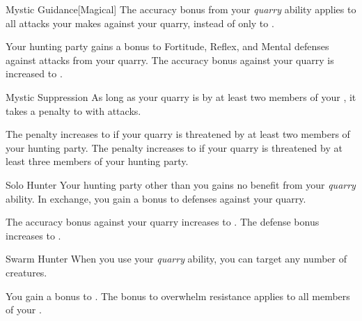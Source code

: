 {            \begin{freeability}{Mystic Guidance}[Magical]
                The accuracy bonus from your \textit{quarry} ability applies to all attacks your  makes against your quarry, instead of only to .

                \rankline
                 Your hunting party gains a  bonus to Fortitude, Reflex, and Mental defenses against attacks from your quarry.
                 The accuracy bonus against your quarry is increased to .
            \end{freeability}

            \begin{freeability}{Mystic Suppression}
                As long as your quarry is  by at least two members of your , it takes a  penalty to  with  attacks.

                \rankline
                 The penalty increases to  if your quarry is threatened by at least two members of your hunting party.
                 The penalty increases to  if your quarry is threatened by at least three members of your hunting party.
            \end{freeability}

            \begin{freeability}{Solo Hunter}
                Your hunting party other than you gains no benefit from your \textit{quarry} ability.
                In exchange, you gain a  bonus to defenses against your quarry.

                \rankline
                 The accuracy bonus against your quarry increases to .
                 The defense bonus increases to .
            \end{freeability}

            \begin{freeability}{Swarm Hunter}
                When you use your \textit{quarry} ability, you can target any number of creatures.

                \rankline
                 You gain a  bonus to .
                 The bonus to overwhelm resistance applies to all members of your .
            \end{freeability}

}

